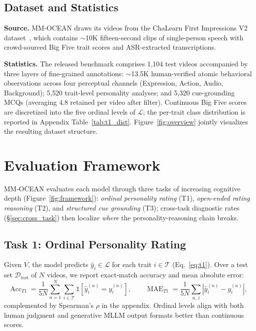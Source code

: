 \documentclass{article}
\newcommand{\benchname}{MM-OCEAN}
\begin{document}
\vspace{-0.2cm}
\subsection{Dataset and Statistics}
\label{sec:data}
\vspace{-0.2cm}
\noindent\textbf{Source.}
\benchname{} draws its videos from the ChaLearn First Impressions V2 dataset~\cite{escalante2020modeling}, which contains $\sim$10K fifteen-second clips of single-person speech with crowd-sourced Big Five trait scores and ASR-extracted transcriptions. 

\noindent\textbf{Statistics.}
\label{sec:stats}
The released benchmark comprises 1{,}104 test videos accompanied by three layers of fine-grained annotations: $\sim$13.5K human-verified atomic behavioral observations 
across four perceptual channels (Expression, Action, Audio, Background); 5{,}520 trait-level personality analyses;
and 5{,}320 cue-grounding MCQs (averaging $4.8$ retained per video after filter). Continuous Big Five scores are discretized into the five ordinal levels of $\mathcal{L}$; the per-trait class distribution is reported in Appendix Table~\ref{tab:t1_dist}. Figure~\ref{fig:overview} jointly visualizes the resulting dataset structure.

\section{Evaluation Framework}
\label{sec:eval}

\benchname{} evaluates each model through three tasks of increasing cognitive depth (Figure~\ref{fig:framework}): \emph{ordinal personality rating} (T1), \emph{open-ended rating reasoning} (T2), and \emph{structured cue grounding} (T3); cross-task diagnostic rates (\S\ref{sec:cross_task}) then localize \emph{where} the personality-reasoning chain breaks.

\subsection{Task 1: Ordinal Personality Rating}
\label{sec:task1}
Given $V$, the model predicts $\hat{y}_i \in \mathcal{L}$ for each trait $i\!\in\!\mathcal{T}$ (Eq.~\ref{eq:t1}). Over a test set $\mathcal{D}_{\text{test}}$ of $N$ videos, we report exact-match accuracy and mean absolute error:
\begin{equation}
\operatorname{Acc}_{T1} = \frac{1}{5N}\sum_{n=1}^{N}\sum_{i\in\mathcal{T}} \mathbb{1}\!\left[\hat{y}_i^{(n)} = y_i^{(n)}\right],
\qquad
\operatorname{MAE}_{T1} = \frac{1}{5N}\sum_{n,\,i} \left|\hat{y}_i^{(n)} - y_i^{(n)}\right|,
\label{eq:t1_metrics}
\end{equation}
complemented by Spearman's $\rho$ in the appendix. Ordinal levels align with both human judgment and generative MLLM output formats better than continuous scores.
\end{document}
